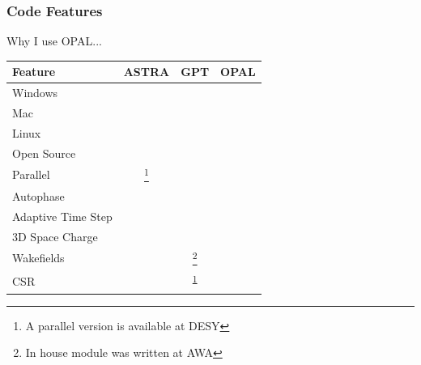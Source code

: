 \documentclass{beamer}
\newcommand{\cmark}{\ding{51}}%
\newcommand{\xmark}{\ding{55}}%
\begin{document}
\begin{frame}
	\frametitle{Code Features}
	\centering
	Why I use OPAL...
	\vspace{-0.2cm}
	\begin{table}
		\begin{minipage}{\textwidth}
			\begin{center}
			\setcounter{mpfootnote}{\value{footnote}}%
			\renewcommand{\thempfootnote}{\arabic{mpfootnote}}%
		\begin{tabular}{l c c c}
			\toprule
			\textbf{Feature} & \textbf{ASTRA} & \textbf{GPT} & \textbf{OPAL}\\
			\midrule
			Windows     		& \cmark & \cmark & \xmark \\ 
			Mac         		& \cmark & \cmark & \cmark \\
			Linux       		& \cmark & \cmark & \cmark \\
			Open Source 		& \alert \xmark & \alert \xmark & \color{black!30!green}\cmark \\
			Parallel    		& \alert \xmark\footnote[1]{A parallel version is available at DESY} & \alert \xmark & \color{black!30!green}\cmark \\
			Autophase   		& \cmark & \xmark & \cmark \\
			Adaptive Time Step 	& \xmark & \cmark & \xmark \\
			3D Space Charge 	& \cmark & \cmark & \cmark \\
			Wakefields  		& \cmark & \xmark\footnote[2]{In house module was written at AWA\label{note2}} & \color{black!30!green}\cmark \\
			CSR         		& \alert \xmark & \xmark\textsuperscript{\ref{note2}} & \color{black!30!green}\cmark \\
			\bottomrule
		\end{tabular}
	\end{center}
	\end{minipage}
\end{table}

\end{frame}
\end{document}
